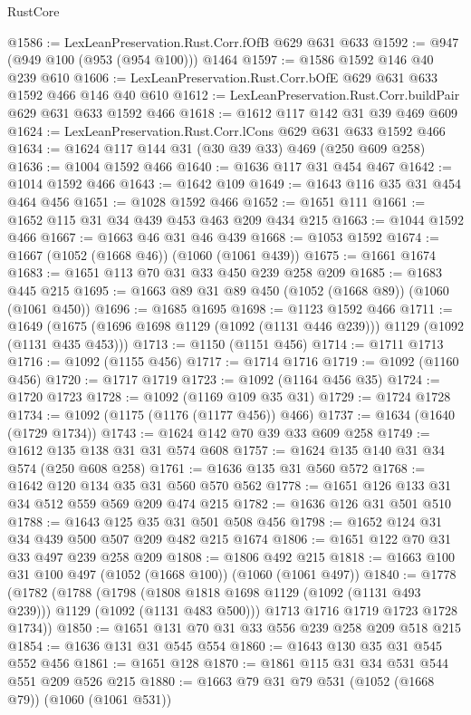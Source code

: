 \begin{lexlean}{RustCore}
\begin{coremodule}
@1586 := LexLeanPreservation.Rust.Corr.fOfB @629 @631 @633
@1592 := @947 (@949 @100 (@953 (@954 @100))) @1464
@1597 := @1586 @1592 @146 @40 @239 @610
@1606 := LexLeanPreservation.Rust.Corr.bOfE @629 @631 @633 @1592 @466 @146 @40 @610
@1612 := LexLeanPreservation.Rust.Corr.buildPair @629 @631 @633 @1592 @466
@1618 := @1612 @117 @142 @31 @39 @469 @609
@1624 := LexLeanPreservation.Rust.Corr.lCons @629 @631 @633 @1592 @466
@1634 := @1624 @117 @144 @31 (@30 @39 @33) @469 (@250 @609 @258)
@1636 := @1004 @1592 @466
@1640 := @1636 @117 @31 @454 @467
@1642 := @1014 @1592 @466
@1643 := @1642 @109
@1649 := @1643 @116 @35 @31 @454 @464 @456
@1651 := @1028 @1592 @466
@1652 := @1651 @111
@1661 := @1652 @115 @31 @34 @439 @453 @463 @209 @434 @215
@1663 := @1044 @1592 @466
@1667 := @1663 @46 @31 @46 @439
@1668 := @1053 @1592
@1674 := @1667 (@1052 (@1668 @46)) (@1060 (@1061 @439))
@1675 := @1661 @1674
@1683 := @1651 @113 @70 @31 @33 @450 @239 @258 @209
@1685 := @1683 @445 @215
@1695 := @1663 @89 @31 @89 @450 (@1052 (@1668 @89)) (@1060 (@1061 @450))
@1696 := @1685 @1695
@1698 := @1123 @1592 @466
@1711 := @1649 (@1675 (@1696 @1698 @1129 (@1092 (@1131 @446 @239))) @1129 (@1092 (@1131 @435 @453)))
@1713 := @1150 (@1151 @456)
@1714 := @1711 @1713
@1716 := @1092 (@1155 @456)
@1717 := @1714 @1716
@1719 := @1092 (@1160 @456)
@1720 := @1717 @1719
@1723 := @1092 (@1164 @456 @35)
@1724 := @1720 @1723
@1728 := @1092 (@1169 @109 @35 @31)
@1729 := @1724 @1728
@1734 := @1092 (@1175 (@1176 (@1177 @456)) @466)
@1737 := @1634 (@1640 (@1729 @1734))
@1743 := @1624 @142 @70 @39 @33 @609 @258
@1749 := @1612 @135 @138 @31 @31 @574 @608
@1757 := @1624 @135 @140 @31 @34 @574 (@250 @608 @258)
@1761 := @1636 @135 @31 @560 @572
@1768 := @1642 @120 @134 @35 @31 @560 @570 @562
@1778 := @1651 @126 @133 @31 @34 @512 @559 @569 @209 @474 @215
@1782 := @1636 @126 @31 @501 @510
@1788 := @1643 @125 @35 @31 @501 @508 @456
@1798 := @1652 @124 @31 @34 @439 @500 @507 @209 @482 @215 @1674
@1806 := @1651 @122 @70 @31 @33 @497 @239 @258 @209
@1808 := @1806 @492 @215
@1818 := @1663 @100 @31 @100 @497 (@1052 (@1668 @100)) (@1060 (@1061 @497))
@1840 := @1778
    (@1782
      (@1788
        (@1798 (@1808 @1818 @1698 @1129 (@1092 (@1131 @493 @239))) @1129 (@1092 (@1131 @483 @500)))
        @1713
        @1716
        @1719
        @1723
        @1728
        @1734))
@1850 := @1651 @131 @70 @31 @33 @556 @239 @258 @209 @518 @215
@1854 := @1636 @131 @31 @545 @554
@1860 := @1643 @130 @35 @31 @545 @552 @456
@1861 := @1651 @128
@1870 := @1861 @115 @31 @34 @531 @544 @551 @209 @526 @215
@1880 := @1663 @79 @31 @79 @531 (@1052 (@1668 @79)) (@1060 (@1061 @531))

\end{coremodule}
\end{lexlean}
